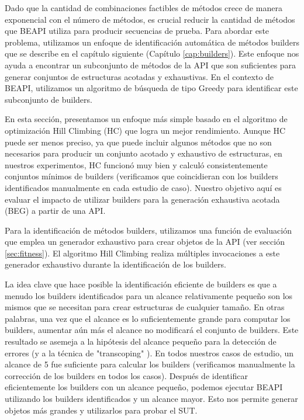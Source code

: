 Dado que la cantidad de combinaciones factibles de métodos crece de manera exponencial con el número de métodos, es crucial reducir la cantidad de métodos que \textsf{BEAPI} utiliza para producir secuencias de prueba. Para abordar este problema, utilizamos un enfoque de identificación automática de métodos builders que se describe en el capítulo siguiente (Capítulo \ref{cap:builders}). Este enfoque nos ayuda a encontrar un subconjunto de métodos de la API que son suficientes para generar conjuntos de estructuras acotadas y exhaustivas. En el contexto de \textsf{BEAPI}, utilizamos un algoritmo de búsqueda de tipo Greedy para identificar este subconjunto de builders.

En esta sección, presentamos un enfoque más simple basado en el algoritmo de optimización Hill Climbing (HC) que logra un mejor rendimiento. Aunque HC puede ser menos preciso, ya que puede incluir algunos métodos que no son necesarios para producir un conjunto acotado y exhaustivo de estructuras, en nuestros experimentos, HC funcionó muy bien y calculó consistentemente conjuntos mínimos de builders (verificamos que coincidieran con los builders identificados manualmente en cada estudio de caso). Nuestro objetivo aquí es evaluar el impacto de utilizar builders para la generación exhaustiva acotada (BEG) a partir de una API.

Para la identificación de métodos builders, utilizamos una función de evaluación que emplea un generador exhaustivo para crear objetos de la API (ver sección \ref{sec:fitness}). El algoritmo Hill Climbing realiza múltiples invocaciones a este generador exhaustivo durante la identificación de los builders.

La idea clave que hace posible la identificación eficiente de builders es que a menudo los builders identificados para un alcance relativamente pequeño son los mismos que se necesitan para crear estructuras de cualquier tamaño. En otras palabras, una vez que el alcance es lo suficientemente grande para computar los builders, aumentar aún más el alcance no modificará el conjunto de builders. Este resultado se asemeja a la hipótesis del alcance pequeño para la detección de errores \cite{Andoni02} (y a la técnica de "transcoping" \cite{Rosner13}). En todos nuestros casos de estudio, un alcance de 5 fue suficiente para calcular los builders (verificamos manualmente la corrección de los builders en todos los casos). Después de identificar eficientemente los builders con un alcance pequeño, podemos ejecutar \textsf{BEAPI} utilizando los builders identificados y un alcance mayor. Esto nos permite generar objetos más grandes y utilizarlos para probar el SUT.

